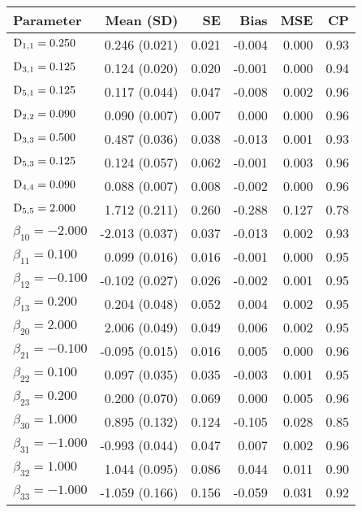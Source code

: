 \begin{table}[ht]
\centering
{}
\captionsetup{font=scriptsize}
\begingroup\scriptsize
\begin{tabular}{l|rrrrr}
  Parameter & Mean (SD) & SE & Bias & MSE & CP \\ 
  \hline
  $\mathrm{D}_{1,1} = 0.250$ &  0.246 (0.021) & 0.021 & -0.004 & 0.000 & 0.93 \\ 
  $\mathrm{D}_{3,1} = 0.125$ &  0.124 (0.020) & 0.020 & -0.001 & 0.000 & 0.94 \\ 
  $\mathrm{D}_{5,1} = 0.125$ &  0.117 (0.044) & 0.047 & -0.008 & 0.002 & 0.96 \\ 
  $\mathrm{D}_{2,2} = 0.090$ &  0.090 (0.007) & 0.007 &  0.000 & 0.000 & 0.96 \\ 
  $\mathrm{D}_{3,3} = 0.500$ &  0.487 (0.036) & 0.038 & -0.013 & 0.001 & 0.93 \\ 
  $\mathrm{D}_{5,3} = 0.125$ &  0.124 (0.057) & 0.062 & -0.001 & 0.003 & 0.96 \\ 
  $\mathrm{D}_{4,4} = 0.090$ &  0.088 (0.007) & 0.008 & -0.002 & 0.000 & 0.96 \\ 
  $\mathrm{D}_{5,5} = 2.000$ &  1.712 (0.211) & 0.260 & -0.288 & 0.127 & 0.78 \\ 
  $\beta_{10} = -2.000$ & -2.013 (0.037) & 0.037 & -0.013 & 0.002 & 0.93 \\ 
  $\beta_{11} = 0.100$ &  0.099 (0.016) & 0.016 & -0.001 & 0.000 & 0.95 \\ 
  $\beta_{12} = -0.100$ & -0.102 (0.027) & 0.026 & -0.002 & 0.001 & 0.95 \\ 
  $\beta_{13} = 0.200$ &  0.204 (0.048) & 0.052 &  0.004 & 0.002 & 0.95 \\ 
  $\beta_{20} = 2.000$ &  2.006 (0.049) & 0.049 &  0.006 & 0.002 & 0.95 \\ 
  $\beta_{21} = -0.100$ & -0.095 (0.015) & 0.016 &  0.005 & 0.000 & 0.96 \\ 
  $\beta_{22} = 0.100$ &  0.097 (0.035) & 0.035 & -0.003 & 0.001 & 0.95 \\ 
  $\beta_{23} = 0.200$ &  0.200 (0.070) & 0.069 &  0.000 & 0.005 & 0.96 \\ 
  $\beta_{30} = 1.000$ &  0.895 (0.132) & 0.124 & -0.105 & 0.028 & 0.85 \\ 
  $\beta_{31} = -1.000$ & -0.993 (0.044) & 0.047 &  0.007 & 0.002 & 0.96 \\ 
  $\beta_{32} = 1.000$ &  1.044 (0.095) & 0.086 &  0.044 & 0.011 & 0.90 \\ 
  $\beta_{33} = -1.000$ & -1.059 (0.166) & 0.156 & -0.059 & 0.031 & 0.92 \\ 

\end{tabular}
\end{table}
